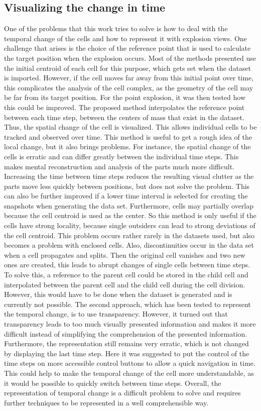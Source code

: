 \subsection{Visualizing the change in time}
One of the problems that this work tries to solve is how to deal with the temporal change of the cells and how to represent it with explosion views. One challenge that arises is the choice of the reference point that is used to calculate the target position when the explosion occurs. Most of the methods presented use the initial centroid of each cell for this purpose, which gets set when the dataset is imported. However, if the cell moves far away from this initial point over time, this complicates the analysis of the cell complex, as the geometry of the cell may be far from its target position.
For the point explosion, it was then tested how this could be improved. The proposed method interpolates the reference point between each time step, between the centers of mass that exist in the dataset. Thus, the spatial change of the cell is visualized. This allows individual cells to be tracked and observed over time. This method is useful to get a rough idea of the local change, but it also brings problems. For instance, the spatial change of the cells is erratic and can differ greatly between the individual time steps. This makes mental reconstruction and analysis of the parts much more difficult. Increasing the time between time steps reduces the resulting visual clutter as the parts move less quickly between positions, but does not solve the problem. This can also be further improved if a lower time interval is selected for creating the snapshots when generating the data set. Furthermore, cells may partially overlap because the cell centroid is used as the center. So this method is only useful if the cells have strong locality, because single outsiders can lead to strong deviations of the cell centroid. This problem occurs rather rarely in the datasets used, but also becomes a problem with enclosed cells. Also, discontinuities occur in the data set when a cell propagates and splits. Then the original cell vanishes and two new ones are created, this leads to abrupt changes of single cells between time steps. To solve this, a reference to the parent cell could be stored in the child cell and interpolated between the parent cell and the child cell during the cell division. However, this would have to be done when the dataset is generated and is currently not possible.
The second approach, which has been tested to represent the temporal change, is to use transparency. However, it turned out that transparency leads to too much visually presented information and makes it more difficult instead of simplifying the comprehension of the presented information. Furthermore, the representation still remains very erratic, which is not changed by displaying the last time step. Here it was suggested to put the control of the time steps on more accessible control buttons to allow a quick navigation in time. This could help to make the temporal change of the cell more understandable, as it would be possible to quickly switch between time steps.
Overall, the representation of temporal change is a difficult problem to solve and requires further techniques to be represented in a well comprehensible way.

